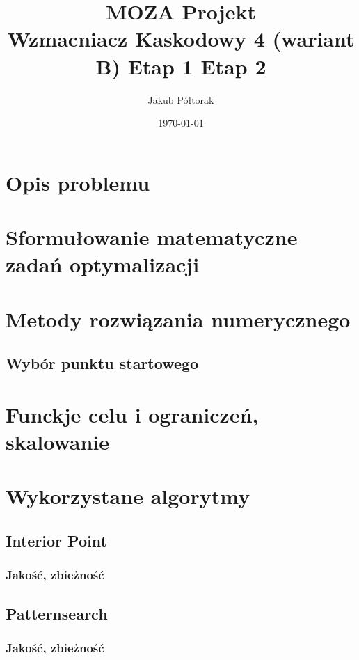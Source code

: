 \documentclass{article}
\title{\huge  \Huge \textbf{MOZA Projekt} \\ \textbf{Wzmacniacz Kaskodowy 4 (wariant B)}}
\date{\today}
\author{ \LARGE Jakub Półtorak}
\begin{document}
\maketitle
{}
\newpage
{}
\tableofcontents


\begin{center}
	\title{ \huge \textbf{Etap 1}}
\end{center}


\section{Opis problemu}
\section{Sformułowanie matematyczne zadań optymalizacji}
\section{Metody rozwiązania numerycznego}
\subsection*{Wybór punktu startowego}

\pagebreak
\begin{center}
	\title{ \huge \textbf{Etap 2}}
\end{center}

\section{Funckje celu i ograniczeń, skalowanie}
\section{Wykorzystane algorytmy}
\subsection{Interior Point}
\subsubsection*{Jakość, zbieżność}
\subsection{Patternsearch}
\subsubsection*{Jakość, zbieżność}
\end{document}
